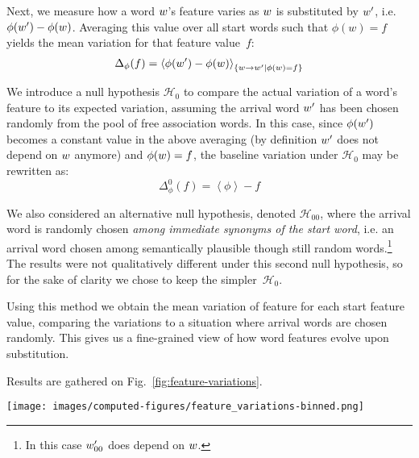 Next, we measure how a word $w$'s feature varies as $w$ is substituted by $w'$, i.e. $\phi(w') - \phi(w)$.
Averaging this value over all start words such that $\phi(w) = f$ yields the mean variation for that feature value~$f$:
$$\Delta_{\phi}(f) = \left< \phi(w') - \phi(w) \right>_{\left\lbrace w\rightarrow w' | \phi(w) = f \right\rbrace}$$

We introduce a null hypothesis $\mathcal{H}_0$ to compare the actual variation of a word's feature to its expected variation, assuming the arrival word $w'$ has been chosen randomly from the pool of free association words.
In this case, since $\phi(w')$ becomes a constant value in the above averaging (by definition $w'$ does not depend on $w$ anymore) and $\phi(w)=f$,  the baseline variation under $\mathcal{H}_0$ may be rewritten as:
$$\Delta_{\phi}^0 (f) = \left<\phi\right>-f$$

We also considered an alternative null hypothesis, denoted $\mathcal{H}_{00}$, where the arrival word is randomly chosen \emph{among immediate synonyms of the start word}, \hbox{i.e.} an arrival word chosen among semantically plausible though still random words.\footnote{In this case $w'_{00}$ does depend on $w$.}
The results were not qualitatively different under this second null hypothesis, so for the sake of clarity we chose to keep the simpler~$\mathcal{H}_0$.

Using this method we obtain the mean variation of feature for each start feature value, comparing the variations to a situation where arrival words are chosen randomly.  This gives us a fine-grained view of how word features evolve upon substitution.


\medskip
Results are gathered on Fig.~\ref{fig:feature-variations}.


\begin{figure*}[!th]
    \centering
    \texttt{[image: images/computed-figures/feature\_variations-binned.png]}
    \caption{\textbf{Feature variation upon substitution:} average feature of the appearing word minus $\mathcal{H}_0$ vs. average feature of the disappearing word in a substitution, with 95\% asymptotic confidence intervals.
    The overall position of the curve with respect to $y = 0$ indicates the direction of the cognitive bias.
    The fact that all the curves have slopes smaller than 1 means that the substitution operation is contractile on average: each feature will converge towards its own specific asymptotic range, which is consistent with the evolution observed in Figure~\ref{fig:timebags-evolution}.}
    \label{fig:feature-variations}
\end{figure*}